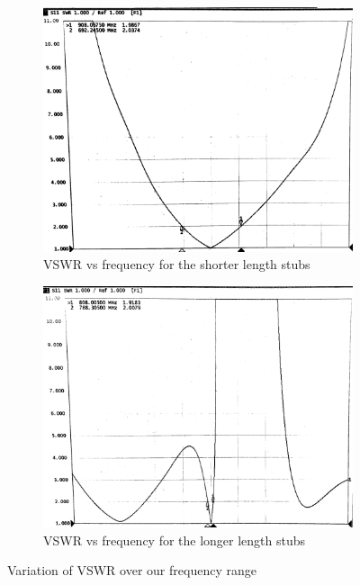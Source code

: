 \documentclass[10pt]{article}
\begin{document}
\begin{figure}[ht]
  \centering
  \begin{subfigure}[b]{0.45\textwidth}
      \includegraphics[width=\textwidth]{../photos/lab3/short_pair_bw.jpg}
      \caption{VSWR vs frequency for the shorter length stubs}
  \end{subfigure}
  \quad
  \begin{subfigure}[b]{0.45\textwidth}
    \includegraphics[width=\textwidth]{../photos/lab3/long_pair_bw.jpg}
    \caption{VSWR vs frequency for the longer length stubs}
  \end{subfigure}
  \caption{Variation of VSWR over our frequency range\vspace{-0.3cm}}
  \label{vswr_freq}
\end{figure}
\end{document}
